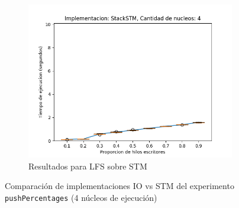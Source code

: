 \begin{appendices}
\begin{figure}[H]
\begin{subfigure}[b]{0.49\textwidth}
        \includegraphics[width=\textwidth]{images/pushPercentages/plots/expStackSTM-4}
        \caption{Resultados para LFS sobre STM}
        \label{subfig:pushPercentages-stackstm-4}
    \end{subfigure}
    \caption{Comparación de implementaciones IO vs STM del experimento \texttt{pushPercentages} (4 núcleos de ejecución)}
    \label{fig:pushPercentages-boxplots-4}
\end{figure}


\end{appendices}
